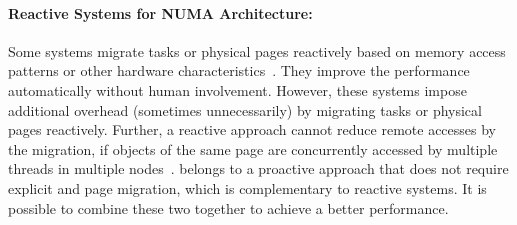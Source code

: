 \paragraph{Reactive Systems for NUMA Architecture:} Some systems migrate tasks or physical pages reactively based on memory access patterns or other hardware characteristics~\citep{Blagodurov:2011:CNC:2002181.2002182, AutoNUMA, Dashti:2013:TMH:2451116.2451157, Lepers:2015:TMP:2813767.2813788}. They improve the performance automatically without human involvement. However, these systems impose additional overhead (sometimes unnecessarily)  by migrating tasks or physical pages reactively. Further, a reactive approach cannot reduce remote accesses by the migration, if objects of the same page are concurrently accessed by multiple threads in multiple nodes~\citep{Gaud:2014:LPM:2643634.2643659}. \NM{} belongs to a proactive approach that does not require explicit and page migration, which is complementary to reactive systems. It is possible to combine these two together to achieve a better performance. 

